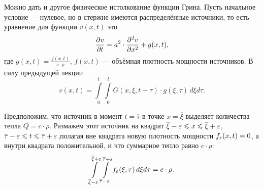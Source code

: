 Можно дать и другое физическое истолкование функции Грина. Пусть начальное условие --- нулевое, но в стержне имеются распределённые источники, то есть уравнение для функции $v(x,t)$ это 
\begin{equation*}
	\frac{\partial v}{\partial t}=a^2\cdot\frac{\partial^2v}{\partial x^2}+g(x,t),
\end{equation*}
где $\displaystyle g(x,t)=\frac{f(x,t)}{c\cdot\rho}$, $f(x,t)$ --- объёмная плотность мощности источников. В силу предыдущей лекции 
\begin{equation}\label{l20:eq:6}
	v(x,t)=\int\limits_0^t\int\limits_0^l G(x,\xi,t-\tau)\cdot g(\xi,\tau)\,d\xi d\tau.
\end{equation}

Предположим, что источник в момент $t=\overline{\tau}$ в точке $x=\overline{\xi}$ выделяет количества тепла $Q=c\cdot\rho$. Размажем этот источник на квадрат $\overline{\xi}-\varepsilon\leqslant x\leqslant \overline{\xi}+\varepsilon$,
$\overline{\tau}-\varepsilon\leqslant t\leqslant \overline{\tau}+\varepsilon$,полагая вне квадрата новую плотность мощности $f_{\varepsilon}(x,t)=0$, а внутри квадрата положительной, и что суммарное тепло равно $c\cdot\rho$:
\begin{equation*}
	\int\limits_{\overline{\xi}-\varepsilon}^{\overline{\xi}+\varepsilon}\int\limits_{\overline{\tau}-\varepsilon}^{\overline{\tau}+\varepsilon} f_{\varepsilon}(\xi,\tau)\,d\xi d\tau=c\cdot\rho.
\end{equation*} 




